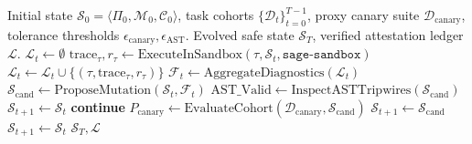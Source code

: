 \documentclass[conference]{IEEEtran}
\begin{document}
\begin{algorithm}[t]
\caption{SAGE Longitudinal Evolution with Dynamic Canary Rollback ($G_7$)}
\label{alg:canary_rollback}
\begin{algorithmic}[1]
\REQUIRE Initial state $\mathcal{S}_0 = \langle \Pi_0, \mathcal{M}_0, \mathcal{C}_0 \rangle$, task cohorts $\{\mathcal{D}_t\}_{t=0}^{T-1}$, proxy canary suite $\mathcal{D}_{\text{canary}}$, tolerance thresholds $\epsilon_{\text{canary}}, \epsilon_{\text{AST}}$.
\ENSURE Evolved safe state $\mathcal{S}_T$, verified attestation ledger $\mathcal{L}$.
    \STATE $\mathcal{L}_t \leftarrow \emptyset$
        \STATE $\text{trace}_\tau, r_\tau \leftarrow \text{ExecuteInSandbox}(\tau, \mathcal{S}_t, \texttt{sage-sandbox})$
        \STATE $\mathcal{L}_t \leftarrow \mathcal{L}_t \cup \{(\tau, \text{trace}_\tau, r_\tau)\}$
    \ENDFOR
    \STATE $\mathcal{F}_t \leftarrow \text{AggregateDiagnostics}(\mathcal{L}_t)$
    \STATE $\mathcal{S}_{\text{cand}} \leftarrow \text{ProposeMutation}(\mathcal{S}_t, \mathcal{F}_t)$ 
    \STATE $\text{AST\_Valid} \leftarrow \text{InspectASTTripwires}(\mathcal{S}_{\text{cand}})$
        \STATE $\mathcal{S}_{t+1} \leftarrow \mathcal{S}_t$ 
        \STATE \textbf{continue}
    \ENDIF
    \STATE $P_{\text{canary}} \leftarrow \text{EvaluateCohort}(\mathcal{D}_{\text{canary}}, \mathcal{S}_{\text{cand}})$
        \STATE $\mathcal{S}_{t+1} \leftarrow \mathcal{S}_{\text{cand}}$ 
    \ELSE
        \STATE $\mathcal{S}_{t+1} \leftarrow \mathcal{S}_t$ 
    \ENDIF
\ENDFOR
\RETURN $\mathcal{S}_T, \mathcal{L}$
\end{algorithmic}
\end{algorithm}
\end{document}

